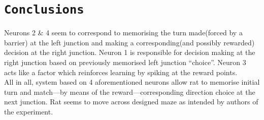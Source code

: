 \documentclass[11pt,a4paper,twocolumn]{article}
\begin{document}
\section*{\texttt{Conclusions}}
Neurons 2 \& 4 seem to correspond to memorising the turn made(forced by a barrier) at the left junction and making a corresponding(and possibly rewarded) decision at the right junction. Neuron 1 is responsible for decision making at the right junction based on previously memorised left junction ``choice''. Neuron 3 acts like a factor which reinforces learning by spiking at the reward points.\\
All in all, system based on 4 aforementioned neurons allow rat to memorise initial turn and match---by means of the reward---corresponding direction choice at the next junction. Rat seems to move across designed maze as intended by authors of the experiment.\\
\end{document}
